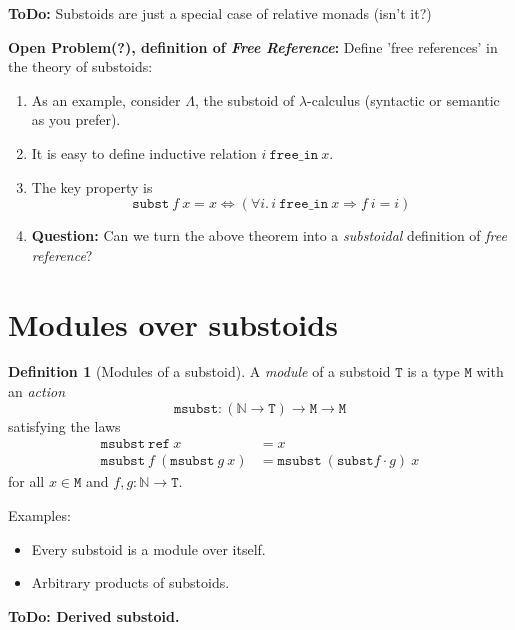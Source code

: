 \documentclass[a4paper,twoside,12pt]{article}
\theoremstyle{definition}
\newtheorem{definition}{Definition}
\theoremstyle{remark}
\newcommand{\NN}{\mathbb{N}}
\newcommand{\subst}{\mathtt{subst}}
\newcommand{\refe}{\mathtt{ref}}
\newcommand{\TT}{\mathtt{T}}
\newcommand{\MM}{\mathtt{M}}
\newcommand{\msubst}{\mathtt{msubst}}
\begin{document}
\textbf{ToDo:} Substoids are just a special case of relative monads (isn't it?)

\textbf{Open Problem(?), definition of \emph{Free Reference}:}
Define 'free references' in the theory of substoids:
\begin{enumerate}
\item As an example, consider $\Lambda$, the substoid of
  $\lambda$-calculus (syntactic or semantic as you prefer).
\item It is easy to define inductive relation
  $i\ \mathtt{free\_in}\ x$.
\item The key property is
  \begin{equation*}
    \subst\ f\ x = x \Longleftrightarrow
    (\forall i.\, i\ \mathtt{free\_in}\ x \Longrightarrow f\ i = i)
  \end{equation*}
\item \textbf{Question:} Can we turn the above theorem into a
  \emph{substoidal} definition of \emph{free reference}?
\end{enumerate}

\section{Modules over substoids}
\label{sec:modules}

\begin{definition}[Modules of a substoid]
  A \emph{module} of a substoid $\TT$ is a type $\MM$ with an
  \emph{action}
  \begin{equation*}
    \msubst\colon (\NN\to \TT) \to \MM \to \MM
  \end{equation*}
  satisfying the laws
  \begin{align*}
    \msubst\ \refe\ x &= x\\
    \msubst\ f\ (\msubst\ g\ x) &= \msubst\ (\subst f \cdot g)\ x
  \end{align*}
  for all $x\in \MM$ and $f,g\colon \NN \to \TT$.
\end{definition}

Examples:
\begin{itemize}
\item Every substoid is a module over itself.
\item Arbitrary products of substoids.
\end{itemize}

\textbf{ToDo: Derived substoid.}
\end{document}
